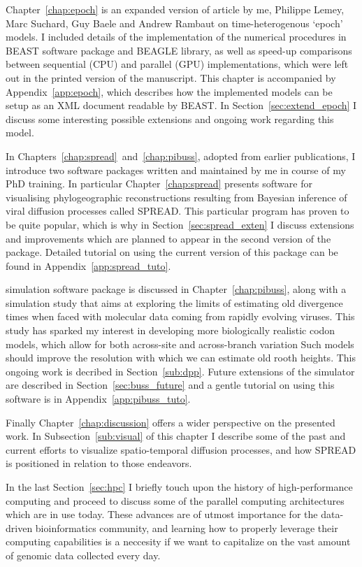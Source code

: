 Chapter~\ref{chap:epoch} is an expanded version of article by me, Philippe Lemey, Marc Suchard, Guy Baele and Andrew Rambaut \citep{Bielejec2014a} on time-heterogenous `epoch' models.
I included details of the implementation of the numerical procedures in BEAST software package and BEAGLE library, as well as speed-up comparisons between sequential (CPU) and parallel (GPU) implementations, which were left out in the printed version of the manuscript.
This chapter is accompanied by Appendix~\ref{app:epoch}, which describes how the implemented models can be setup as an XML document readable by BEAST.
In Section~\ref{sec:extend_epoch} I discuss some interesting possible extensions and ongoing work regarding this model.

In Chapters~\ref{chap:spread}~and~\ref{chap:pibuss}, adopted from earlier publications, I introduce two software packages written and maintained by me in course of my PhD training.
In particular Chapter~\ref{chap:spread} presents software for visualising phylogeographic reconstructions resulting from Bayesian inference of viral diffusion processes called SPREAD.
This particular program has proven to be quite popular, which is why in Section~\ref{sec:spread_exten} I discuss extensions and improvements which are planned to appear in the second version of the package.
Detailed tutorial on using the current version of this package can be found in Appendix~\ref{app:spread_tuto}.

{\bussname} simulation software package is discussed in Chapter~\ref{chap:pibuss}, along with a simulation study that aims at exploring the limits of estimating old divergence times when faced with molecular data coming from rapidly evolving viruses.
This study has sparked my interest in developing more biologically realistic codon models, which allow for both across-site and across-branch variation
Such models should improve the resolution with which we can estimate old rooth heights. %
This ongoing work is decribed in Section~\ref{sub:dpp}.
Future extensions of the {\bussname} simulator are described in Section~\ref{sec:buss_future} and a gentle tutorial on using this software is in Appendix~\ref{app:pibuss_tuto}.

Finally Chapter~\ref{chap:discussion} offers a wider perspective on the presented work. 
In Subsection~\ref{sub:visual} of this chapter I describe some of the past and current efforts to visualize spatio-temporal diffusion processes, and how SPREAD is positioned in relation to those endeavors.

In the last Section~\ref{sec:hpc} I briefly touch upon the history of high-performance computing and proceed to discuss some of the parallel computing architectures which are in use today. 
These advances are of utmost importance for the data-driven bioinformatics community, and learning how to properly leverage their computing capabilities is a neccesity if we want to capitalize on the vast amount of genomic data collected every day.









